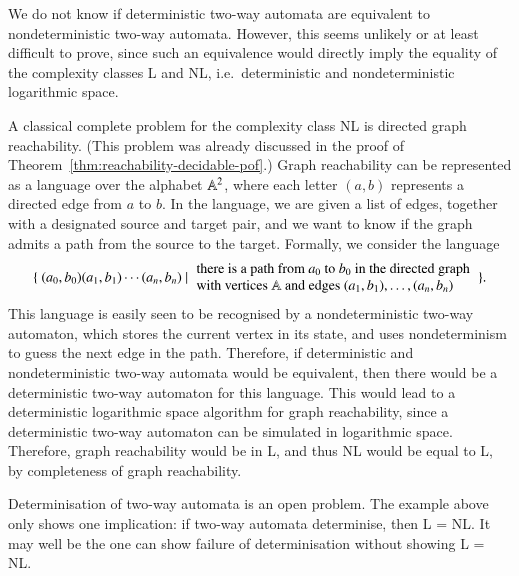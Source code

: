 We do not know if deterministic two-way automata are equivalent to nondeterministic two-way automata. However, this seems unlikely or at least difficult to prove, since such an equivalence would directly imply the equality of the complexity classes L and NL, i.e.~deterministic and nondeterministic logarithmic space.
\begin{myexample}
	 \label{ex:reachability-two-way}
	A classical complete problem for the complexity class NL is directed graph reachability. (This problem was already discussed in  the proof of Theorem~\ref{thm:reachability-decidable-pof}.) Graph reachability can be represented as a language over the alphabet $\mathbb A^2$, where each letter $(a,b)$ represents a directed edge from $a$ to $b$. In the language, we are given a list of edges, together with a designated source and target pair, and  we want to know if the graph admits a path from the source to the target. Formally, we consider the language
	\begin{align*}
	\setbuild{ (a_0,b_0)(a_1,b_1) \cdots (a_n,b_n) }{there is a path from $a_0$ to $b_0$ in the directed graph \\ with vertices $\atoms$ and edges $(a_1,b_1),\ldots,(a_n,b_n)$}.
	\end{align*}
	This language is easily seen to be recognised by a nondeterministic two-way automaton, which stores the current vertex in its state, and uses nondeterminism to guess the next edge in the path. Therefore, if deterministic and nondeterministic two-way automata would be equivalent, then there would be a deterministic two-way automaton for this language. This would lead to a deterministic logarithmic space algorithm for graph reachability, since a deterministic two-way automaton can be simulated in logarithmic space. Therefore, graph reachability would be in L, and thus NL  would be equal to L, by completeness of graph reachability.
\end{myexample}

Determinisation of two-way automata is an open problem. 
The example above only shows one implication: if two-way automata determinise, then L = NL. It may well be the one can show failure of determinisation without showing L = NL. 
\exercisepart


